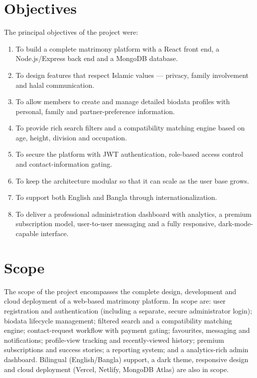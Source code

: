 \documentclass[12pt,a4paper]{report}
\begin{document}
\section{Objectives}
The principal objectives of the project were:
\begin{enumerate}
  \item To build a complete matrimony platform with a React front end, a
        Node.js/Express back end and a MongoDB database.
  \item To design features that respect Islamic values --- privacy, family
        involvement and halal communication.
  \item To allow members to create and manage detailed biodata profiles with
        personal, family and partner-preference information.
  \item To provide rich search filters and a compatibility matching engine
        based on age, height, division and occupation.
  \item To secure the platform with JWT authentication, role-based access
        control and contact-information gating.
  \item To keep the architecture modular so that it can scale as the user base
        grows.
  \item To support both English and Bangla through internationalization.
  \item To deliver a professional administration dashboard with analytics, a
        premium subscription model, user-to-user messaging and a fully
        responsive, dark-mode-capable interface.
\end{enumerate}

\section{Scope}
The scope of the project encompasses the complete design, development and
cloud deployment of a web-based matrimony platform. In scope are: user
registration and authentication (including a separate, secure administrator
login); biodata lifecycle management; filtered search and a compatibility
matching engine; contact-request workflow with payment gating; favourites,
messaging and notifications; profile-view tracking and recently-viewed history;
premium subscriptions and success stories; a reporting system; and a
analytics-rich admin dashboard. Bilingual (English/Bangla) support, a dark
theme, responsive design and cloud deployment (Vercel, Netlify, MongoDB Atlas)
are also in scope.
\end{document}

